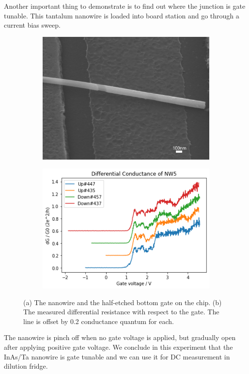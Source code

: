 Another important thing to demonstrate is to find out where the junction is gate tunable. This tantalum nanowire is loaded into board station and go through a current bias sweep.
\begin{figure}[h!]
    \begin{subfigure}[b]{0.47\textwidth}
        \centering
        \includegraphics[width=\textwidth]{Pic/GatetestNW.jpg}
        \caption{}
        \label{fig:my_label}
        \end{subfigure}
     \hfill
     \begin{subfigure}[b]{0.51\textwidth}
         \centering
         \includegraphics[width=\textwidth]{Pic/Gatetest.png}
         \caption{}
         \label{}
     \end{subfigure}
     \caption{(a) The nanowire and the half-etched bottom gate on the chip. (b) The measured differential resistance with respect to the gate. The line is offset by 0.2 conductance quantum for each.}
     \label{}
\end{figure}
The nanowire is pinch off when no gate voltage is applied, but gradually open after applying positive gate voltage. We conclude in this experiment that the InAs/Ta nanowire is gate tunable and we can use it for DC measurement in dilution fridge. 

